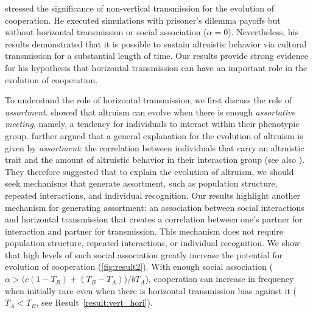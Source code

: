 \documentclass[12pt]{extarticle}
\begin{document}
{\citet{woodcock2006significance} stressed the significance of non-vertical transmission for the evolution of cooperation. He executed simulations with prisoner's dilemma payoffs but without horizontal transmission or social association ($\alpha=0$). Nevertheless, his results demonstrated that it is possible to sustain altruistic behavior via cultural transmission for a substantial length of time.
Our results provide strong evidence for his hypothesis that horizontal transmission can have an important role in the evolution of cooperation. 

To understand the role of horizontal transmission, we first discuss the role of \emph{assortment}.
\citet{Eshel1982} showed that altruism can evolve when there is enough \emph{assortative meeting}, namely, a tendency for individuals to interact within their phenotypic group.
\citet{Fletcher2009assortment}  further argued that a general explanation for the evolution of altruism is given by \emph{assortment}: the correlation between individuals that carry an altruistic trait and the amount of altruistic behavior in their interaction group (see also \citet{Bijma2010assortment}).
They therefore suggested that to explain the evolution of altruism, we should seek mechanisms that generate  assortment, such as population structure, repeated interactions, and individual recognition.
Our results highlight another mechanism for generating assortment: an association between social interactions and horizontal transmission that creates a correlation between one's partner for interaction and partner for transmission.
This mechanism does not require population structure, repeated interactions, or individual recognition.
We show that high levels of such social association greatly increase the potential for evolution of cooperation (\autoref{fig:result2}).
With enough social association ($\alpha > \big(c(1-T_B) + (T_B-T_A)\big) / b T_A$), cooperation can increase in frequency when initially rare even when there is horizontal transmission bias against it ($T_A<T_B$, see Result~\autoref{result:vert_hori}).

}
\end{document}
